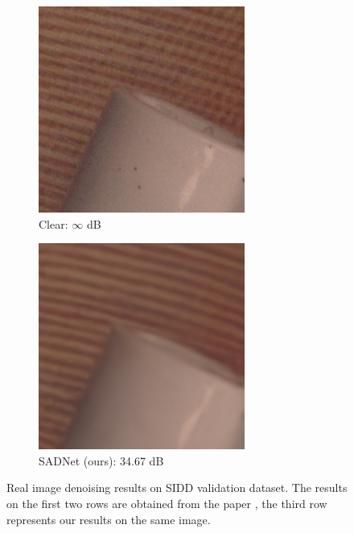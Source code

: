 \begin{figure}[b!]
\begin{subfigure}{0.24\textwidth}
            \includegraphics[width=\linewidth]{images/bardak_gt.png}
            \caption{Clear: $\infty$ dB}
            \label{fig:bardak_clear}
        \end{subfigure}\hfil %
        \begin{subfigure}{0.24\textwidth}
            \includegraphics[width=\linewidth]{images/bardak_out.png}
            \caption{SADNet (ours): 34.67 dB}
            \label{fig:bardak_out}
        \end{subfigure}\hfil %
    \caption{Real image denoising results on SIDD validation dataset. The results on the first two rows are obtained from the paper \cite{10.1007/978-3-030-58577-8_11},  the third row represents our results on the same image.}
    \label{fig:bardak}
\end{figure}


